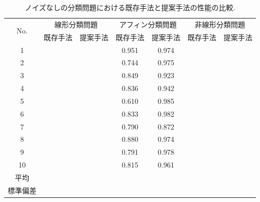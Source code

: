 \documentclass[11pt,oneside,openany,report]{jsbook}
\begin{document}
\begin{table}[tbp]
  \caption{ノイズなしの分類問題における既存手法と提案手法の性能の比較.}
  \label{table:exp:result:classification}
  \centering
  \begin{tabular}{|c|c|c|c|c|c|c|}
    \hline
    \multirow{2}{*}{No. } & \multicolumn{2}{c|}{線形分類問題} & \multicolumn{2}{c|}{アフィン分類問題} & \multicolumn{2}{c|}{非線形分類問題} \\
    \cline{2-7}
    & 既存手法 & 提案手法 & 既存手法 & 提案手法 & 既存手法 & 提案手法 \\
    \hline \hline
    1       &   &  & 0.951 & 0.974 &  &  \\
    2       &   &  & 0.744 & 0.975 &  &  \\
    3       &   &  & 0.849 & 0.923 &  &  \\
    4       &   &  & 0.836 & 0.942 &  &  \\
    5       &   &  & 0.610 & 0.985 &  &  \\
    6       &   &  & 0.833 & 0.982 &  &  \\
    7       &   &  & 0.790 & 0.872 &  &  \\
    8       &   &  & 0.880 & 0.974 &  &  \\
    9       &   &  & 0.791 & 0.978 &  &  \\
    10      &   &  & 0.815 & 0.961 &  &  \\
    \hline
    平均 & & & & & & \\
    標準偏差 & & & & & & \\
    \hline
  \end{tabular}
\end{table}
\end{document}
